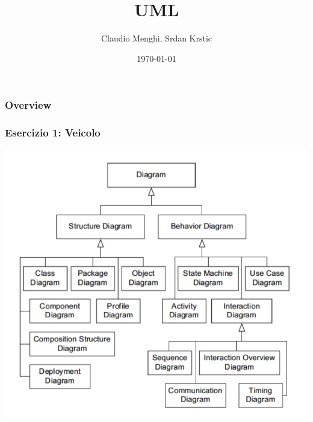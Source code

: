 \documentclass{beamer}
\title[Introduzione]{UML} %
\author{Claudio Menghi,  Srdan Krstic} %
\institute[Deepse group] %
{
Politecnico di Milano \\ %
\medskip
\textit{menghi@elet.polimi.it,  srdan.krstic@polimi.it} %
}
\date{\today} %
\begin{document}
\begin{frame}
\titlepage %
\end{frame}

\begin{frame}
\frametitle{Overview} %
\tableofcontents %
\end{frame}



\begin{frame}
\frametitle{Esercizio 1: Veicolo}
\includegraphics[scale=0.30]{Img/DiagrammiUML.png}

\end{frame}
\end{document}
